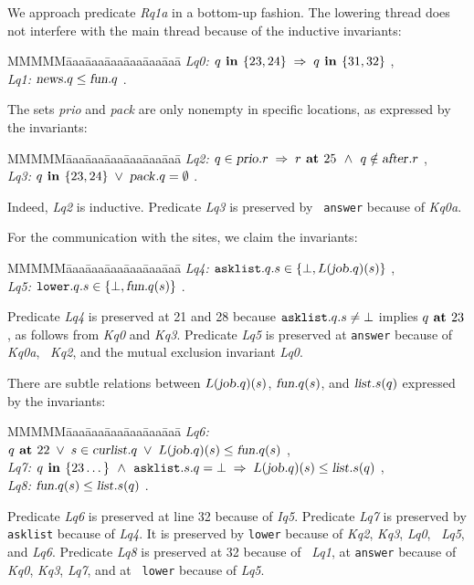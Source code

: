 \documentclass[10pt]{article} \usepackage[english]{babel}
\newenvironment{tab}{\begin{tabbing}
MMMMM\=aaa\=aaa\=aaa\=aaa\=aaa\=aaa\= \kill}{\end{tabbing}}
\def\S #1/{\mbox {\textsl{#1}}}
\def\B #1/{\mbox {\textbf{#1}}}
\def\T #1/{\mbox {\texttt{#1}}}
\def\Implies{\;\Rightarrow\;}
\def\Land   {\mbox{ $\;\land\;$ }}
\def\Lor    {\;\lor\;}
\begin{document}
We approach predicate \S Rq1a/ in a bottom-up fashion.  The lowering
thread does not interfere with the main thread because of the
inductive invariants:
\begin{tab}
  \S Lq0:/ \> $ q\B\ in /\{23, 24\} \Implies q\B\ in /\{31, 32\} $ ,\\
  \S Lq1:/ \> $ \S news/.q \leq \S fun/.q  $ .
\end{tab}
The sets \S prio/ and \S pack/ are only nonempty in specific
locations, as expressed by the invariants:
\begin{tab}
  \S Lq2:/ \> $ q\in\S prio/.r \Implies r\B\ at /25 
  \Land q\notin\S after/.r $ ,\\
  \S Lq3:/ \> $ q\B\ in /\{23, 24\} \Lor \S pack/.q = \emptyset $ .
\end{tab}
Indeed, \S Lq2/ is inductive.  Predicate \S Lq3/ is preserved by \T
answer/ because of \S Kq0a/.

For the communication with the sites, we claim the invariants:
\begin{tab}
  \S Lq4:/ \> $ \T asklist/.q.s \in \{\bot, L(\S job/.q)(s) \} $ ,\\
  \S Lq5:/ \> $ \T lower/.q.s \in \{ \bot, \S fun/.q(s)\} $ .
\end{tab}
Predicate \S Lq4/ is preserved at 21 and 28 because $\T asklist/.q.s
\ne\bot$ implies $q\B\ at /23$, as follows from \S Kq0/ and \S Kq3/.
Predicate \S Lq5/ is preserved at \T answer/ because of \S Kq0a/, \S
Kq2/, and the mutual exclusion invariant \S Lq0/.

There are subtle relations between $L(\S job/.q)(s)$, $\S fun/.q(s) $,
and $\S list/.s(q)$ expressed by the invariants:
\begin{tab}
  \S Lq6:/ \> $ q\B\ at / 22\Lor s\in\S curlist/.q
  \Lor L(\S job/.q)(s) \leq \S fun/.q(s) $ ,\\
  \S Lq7:/ \> $ q\B\ in /\{23\dots\} \Land \T asklist/.s.q = \bot
  \Implies L(\S job/.q)(s) \leq \S list/.s(q) $ ,\\
  \S Lq8:/ \> $\S fun/.q(s) \leq \S list/.s(q) $ .
\end{tab}
Predicate \S Lq6/ is preserved at line 32 because of \S Iq5/.
Predicate \S Lq7/ is preserved by \T asklist/ because of \S Lq4/.  It
is preserved by \T lower/ because of \S Kq2/, \S Kq3/, \S Lq0/, \S
Lq5/, and \S Lq6/.  Predicate \S Lq8/ is preserved at 32 because of \S
Lq1/, at \T answer/ because of \S Kq0/, \S Kq3/, \S Lq7/, and at \T
lower/ because of \S Lq5/.
\end{document}
